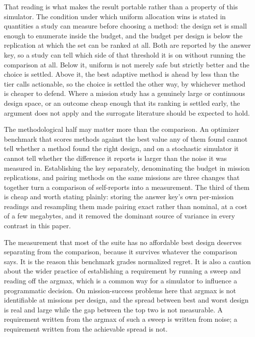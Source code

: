 \documentclass[11pt]{article}
\begin{document}
That reading is what makes the result portable rather than a property of this simulator. The
condition under which uniform allocation wins is stated in quantities a study can measure before
choosing a method: the design set is small enough to enumerate inside the budget, and the budget per
design is below the replication at which the set can be ranked at all. Both are reported by the
answer key, so a study can tell which side of that threshold it is on without running the comparison
at all. Below it, uniform is not merely safe but strictly better and the choice is settled. Above
it, the best adaptive method is ahead by less than the tier calls actionable, so the choice is
settled the other way, by whichever method is cheaper to defend. Where a mission study has a genuinely large or continuous design space, or an outcome
cheap enough that its ranking is settled early, the argument does not apply and the surrogate
literature should be expected to hold.

The methodological half may matter more than the comparison. An optimizer benchmark that scores
methods against the best value any of them found cannot tell whether a method found the right
design, and on a stochastic simulator it cannot tell whether the difference it reports is larger
than the noise it was measured in. Establishing the key separately, denominating the budget in
mission replications, and pairing methods on the same missions are three changes that together turn
a comparison of self-reports into a measurement. The third of them is cheap and worth stating
plainly: storing the answer key's own per-mission readings and resampling them made pairing exact
rather than nominal, at a cost of a few megabytes, and it removed the dominant source of variance
in every contrast in this paper.

The measurement that most of the suite has no affordable best design deserves separating from the
comparison, because it survives whatever the comparison says. It is the reason this benchmark grades
normalized regret. It is also a caution about the wider practice of establishing a requirement by
running a sweep and reading off the argmax, which is a common way for a simulator to influence a
programmatic decision. On \BnKeyNSucc{} mission-success problems here that argmax is not
identifiable at \BnRepsSucc{} missions per design, and the spread between best and worst design is
real and large while the gap between the top two is not measurable. A requirement written from the
argmax of such a sweep is written from noise; a requirement written from the achievable spread is
not.
\end{document}
